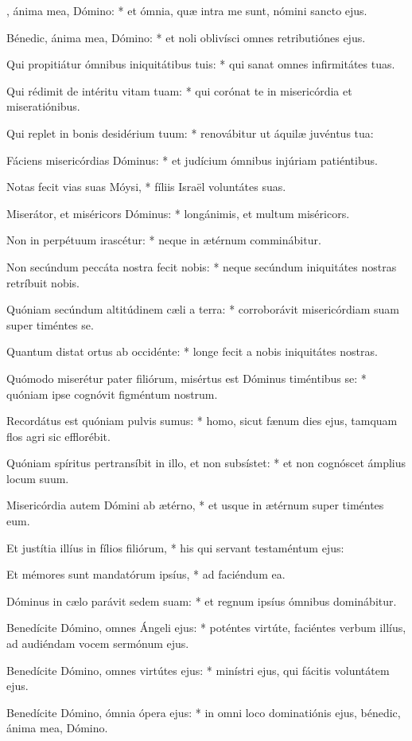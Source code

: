 \begin{psalmus}

, ánima mea, Dómino: * et ómnia, quæ intra me sunt, nómini sancto ejus.

Bénedic, ánima mea, Dómino: * et noli oblivísci omnes retributiónes ejus.

Qui propitiátur ómnibus iniquitátibus tuis: * qui sanat omnes infirmitátes tuas.

Qui rédimit de intéritu vitam tuam: * qui corónat te in misericórdia et miseratiónibus.

Qui replet in bonis desidérium tuum: * renovábitur ut áquilæ juvéntus tua:

Fáciens misericórdias Dóminus: * et judícium ómnibus injúriam patiéntibus.

Notas fecit vias suas Móysi, * fíliis Israël voluntátes suas.

Miserátor, et miséricors Dóminus: * longánimis, et multum miséricors.

Non in perpétuum irascétur: * neque in ætérnum comminábitur.

Non secúndum peccáta nostra fecit nobis: * neque secúndum iniquitátes nostras retríbuit nobis.

Quóniam secúndum altitúdinem cæli a terra: * corroborávit misericórdiam suam super timéntes se.

Quantum distat ortus ab occidénte: * longe fecit a nobis iniquitátes nostras.

Quómodo miserétur pater filiórum, misértus est Dóminus timéntibus se: * quóniam ipse cognóvit figméntum nostrum.

Recordátus est quóniam pulvis sumus: * homo, sicut fænum dies ejus, tamquam flos agri sic efflorébit.

Quóniam spíritus pertransíbit in illo, et non subsístet: * et non cognóscet ámplius locum suum.

Misericórdia autem Dómini ab ætérno, * et usque in ætérnum super timéntes eum.

Et justítia illíus in fílios filiórum, * his qui servant testaméntum ejus:

Et mémores sunt mandatórum ipsíus, * ad faciéndum ea.

Dóminus in cælo parávit sedem suam: * et regnum ipsíus ómnibus dominábitur.

Benedícite Dómino, omnes Ángeli ejus: * poténtes virtúte, faciéntes verbum illíus, ad audiéndam vocem sermónum ejus.

Benedícite Dómino, omnes virtútes ejus: * minístri ejus, qui fácitis voluntátem ejus.

Benedícite Dómino, ómnia ópera ejus: * in omni loco dominatiónis ejus, bénedic, ánima mea, Dómino.

\end{psalmus}
